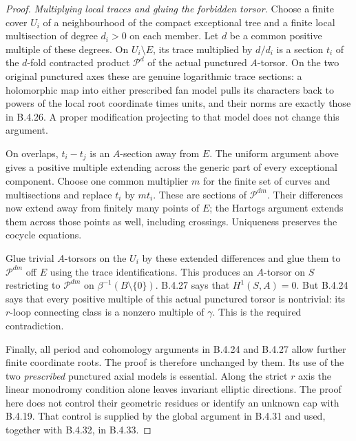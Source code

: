\begin{proof}
\emph{Multiplying local traces and gluing the forbidden torsor.}
Choose a finite cover $U_i$ of a
neighbourhood of the compact exceptional
tree and a finite local multisection of
degree $d_i>0$ on each member. Let $d$ be
a common positive multiple of these degrees.
On $U_i\setminus E$, its trace multiplied
by $d/d_i$ is a section $t_i$ of the
$d$-fold contracted product $\mathcal P^d$
of the actual punctured $A$-torsor.
On the two original punctured axes these
are genuine logarithmic trace sections:
a holomorphic map into either prescribed
fan model pulls its characters back to
powers of the local root coordinate times
units, and their norms are exactly those
in B.4.26. A proper modification projecting
to that model does not change this argument.

On overlaps, $t_i-t_j$ is an $A$-section
away from $E$. The uniform argument above
gives a positive multiple extending across
the generic part of every exceptional
component. Choose one common multiplier
$m$ for the finite set of curves and
multisections and replace $t_i$ by $mt_i$.
These are sections of $\mathcal P^{dm}$.
Their differences now extend away from
finitely many points of $E$; the Hartogs
argument extends them across those points
as well, including crossings. Uniqueness
preserves the cocycle equations.

Glue trivial $A$-torsors on the $U_i$ by
these extended differences and glue them
to $\mathcal P^{dm}$ off $E$ using the
trace identifications. This produces an
$A$-torsor on $S$ restricting to
$\mathcal P^{dm}$ on
$\beta^{-1}(B\setminus\{0\})$.
B.4.27 says that $H^1(S,A)=0$.
But B.4.24 says that every positive
multiple of this actual punctured torsor
is nontrivial: its $r$-loop connecting
class is a nonzero multiple of $\gamma$.
This is the required contradiction.

Finally, all period and cohomology arguments
in B.4.24 and B.4.27 allow further finite
coordinate roots. The proof is therefore
unchanged by them. Its use of the two
\emph{prescribed} punctured axial models
is essential. Along the strict $r$ axis the linear monodromy
condition alone leaves invariant elliptic directions.
The proof here does not control their geometric
residues or identify an unknown cap with B.4.19.
That control is supplied by the global argument in
B.4.31 and used, together with B.4.32, in B.4.33.
\end{proof}
